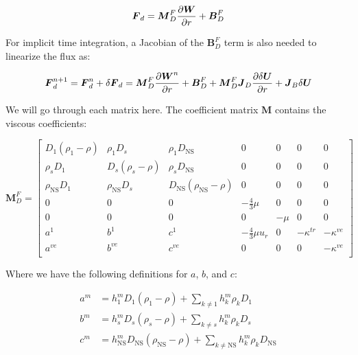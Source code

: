 \documentclass[10pt]{article}
\begin{document}
\begin{flushleft}
\begin{equation*}
    \boldsymbol{F}_d = \boldsymbol{M}_D^F \frac{\partial \boldsymbol{W}}{\partial r} + \boldsymbol{B}_D^F
\end{equation*}

For implicit time integration, a Jacobian of the $\boldsymbol{B}_D^F$ term is also needed to linearize the flux as:

\begin{equation*}
    \boldsymbol{F}_d^{n+1} = \boldsymbol{F}_d^n + \delta \boldsymbol{F}_d = \boldsymbol{M}_D^F \frac{\partial \boldsymbol{W}^n}{\partial r} + \boldsymbol{B}_D^F + \boldsymbol{M}_D^F \boldsymbol{J}_D \frac{\partial \delta \boldsymbol{U}}{\partial r} + \boldsymbol{J}_B \delta \boldsymbol{U}
\end{equation*}

We will go through each matrix here. The coefficient matrix $\boldsymbol{M}$ contains the viscous coefficients:

\begin{equation*}
    \boldsymbol{M}_D^F = \begin{bmatrix}
        D_1(\rho_1-\rho) & \rho_1 D_s & \rho_1 D_\text{NS} & 0 & 0 & 0 & 0 \\
        \rho_s D_1 & D_s(\rho_s - \rho) & \rho_s D_\text{NS} & 0 & 0 & 0 & 0 \\
        \rho_\text{NS} D_1 & \rho_\text{NS} D_s & D_\text{NS}(\rho_\text{NS} - \rho) & 0 & 0 & 0 & 0 \\
        0 & 0 & 0 & -\frac{4}{3} \mu & 0 & 0 & 0 \\
        0 & 0 & 0 & 0 & -\mu & 0 & 0 \\
        a^1 & b^1 & c^1 & - \frac{4}{3} \mu u_r & 0 & -\kappa^{tr} & -\kappa^{ve} \\
        a^{ve} & b^{ve} & c^{ve} & 0 & 0 & 0 & -\kappa^{ve} \\
    \end{bmatrix}
\end{equation*}

Where we have the following definitions for $a$, $b$, and $c$:

\begin{align*}
    a^m &= h_1^m D_1(\rho_1 - \rho) + \sum_{k\neq 1} h_k^m \rho_k D_1 \\
    b^m &= h_s^m D_s (\rho_s - \rho) + \sum_{k\neq s} h_k^m \rho_k D_s \\
    c^m &= h_\text{NS}^m D_\text{NS} (\rho_\text{NS} - \rho) + \sum_{k\neq \text{NS}} h_k^m \rho_k D_\text{NS}
\end{align*}


\end{flushleft}
\end{document}
